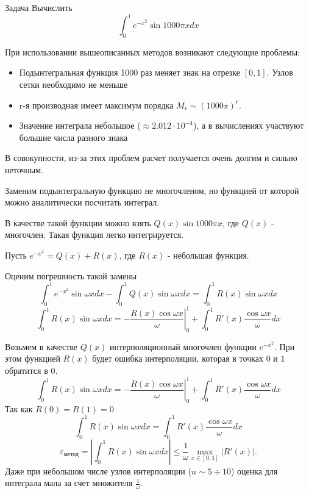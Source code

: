 \documentclass[professionalfonts,compress,unicode]{beamer}
\begin{document}
%
{
	\begin{block}{Задача}
		Вычислить 
		$$
		\int_0^1 e^{-x^2} \sin 1000\pi x dx
		$$
	\end{block}
	\pause
	
	При использовании вышеописанных методов возникают следующие проблемы:
	\begin{itemize}
		\item Подынтегральная функция 1000 раз меняет знак на отрезке $[0,1]$. Узлов сетки необходимо не меньше
		\item r-я производная имеет максимум порядка $M_r \sim (1000\pi)^r$.
		\item Значение интеграла небольшое ($\approx 2.012\cdot10^{-4}$), а в вычислениях участвуют большие числа разного знака
	\end{itemize}
	
	В совокупности, из-за этих проблем расчет получается очень долгим и сильно неточным.
}

{
	Заменим подынтегральную функцию не многочленом, но функцией от которой можно аналитически посчитать
	интеграл.
	\pause
	
	В качестве такой функции можно взять $Q(x) \sin 1000\pi x$, где $Q(x)$ - многочлен.
	Такая функция легко интегрируется.
	\pause
	
	Пусть $e^{-x^2} = Q(x) + R(x)$, где $R(x)$ - небольшая функция.
	
	Оценим погрешность такой замены
	$$
	\int_0^1 e^{-x^2} \sin \omega x dx - \int_0^1 Q(x) \sin \omega x dx =
	\int_0^1 R(x) \sin \omega x dx
	$$
	$$
	\int_0^1 R(x) \sin \omega x dx = - \left.\frac{R(x) \cos \omega x}{\omega} \right|_0^1 +
	\int_0^1 R'(x) \frac{\cos \omega x}{\omega} dx
	$$
}

{
	Возьмем в качестве $Q(x)$ интерполяционный многочлен функции $e^{-x^2}$. При этом функцией $R(x)$
	будет ошибка интерполяции, которая в точках $0$ и $1$ обратится в $0$.
	$$
	\int_0^1 R(x) \sin \omega x dx = - \left.\frac{R(x) \cos \omega x}{\omega} \right|_0^1 +
	\int_0^1 R'(x) \frac{\cos \omega x}{\omega} dx
	$$
	Так как $R(0)=R(1)=0$
	$$
	\int_0^1 R(x) \sin \omega x dx = \int_0^1 R'(x) \frac{\cos \omega x}{\omega} dx
	$$
	$$
	\varepsilon_{\text{метод}} = \left| \int_0^1 R(x) \sin \omega x dx \right| \leq \frac{1}{\omega} \max_{x\in[0,1]} |R'(x)|.
	$$
	Даже при небольшом числе узлов интерполяции ($n \sim 5 \div 10$) оценка для интеграла мала за счет множителя $\frac{1}{\omega}$.
}
\end{document}
